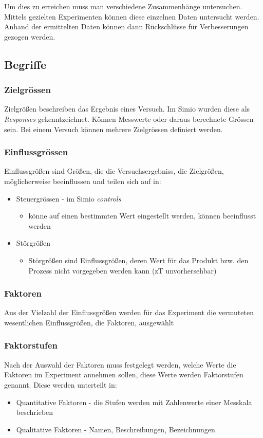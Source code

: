 Um dies zu erreichen muss man verschiedene Zusammenhänge untersuchen. Mittels gezielten Experimenten können diese einzelnen Daten untersucht werden. Anhand der ermittelten Daten können dann Rückschlüsse für Verbesserungen gezogen werden.

\subsection{Begriffe}
\subsubsection{Zielgrössen}
Zielgrößen beschreiben das Ergebnis eines Versuch. Im Simio wurden diese als \textit{Responses} gekenntzeichnet. Können Messwerte oder daraus berechnete Grössen sein. Bei einem Versuch können mehrere Zielgrössen definiert werden.
\subsubsection{Einflussgrössen}
Einflussgrößen sind Größen, die die Versuchsergebniss, die Zielgrößen, möglicherweise beeinflussen und teilen sich auf in:
\begin{itemize}
    \item Steuergrössen - im Simio \textit{controls}
    \begin{itemize}
        \item könne auf einen bestimmten Wert eingestellt werden, können beeinflusst werden
    \end{itemize}
    \item Störgrößen
    \begin{itemize}
        \item Störgrößen sind Einflussgrößen, deren Wert für das Produkt bzw. den  Prozess nicht vorgegeben werden kann (zT unvorhersehbar)
    \end{itemize}
\end{itemize}
\subsubsection{Faktoren}
Aus der Vielzahl der Einflussgrößen werden für das Experiment die vermuteten wesentlichen Einflussgrößen, die Faktoren, ausgewählt

\subsubsection{Faktorstufen}
Nach der Auswahl der Faktoren muss festgelegt werden, welche Werte die Faktoren im Experiment annehmen sollen, diese Werte werden Faktorstufen genannt. Diese werden unterteilt in:
\begin{itemize}
    \item Quantitative Faktoren - die Stufen werden mit Zahlenwerte einer Messkala beschrieben
    \item Qualitative Faktoren - Namen, Beschreibungen, Bezeichnungen
\end{itemize}

